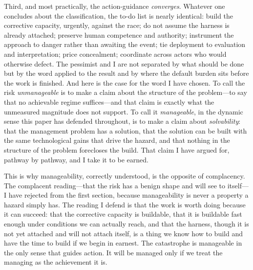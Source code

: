 \documentclass[11pt]{article}
\begin{document}
Third, and most practically, the action-guidance \emph{converges}. Whatever one concludes about the classification, the to-do list is nearly identical: build the corrective capacity, urgently, against the race; do not assume the harness is already attached; preserve human competence and authority; instrument the approach to danger rather than awaiting the event; tie deployment to evaluation and interpretation; price concealment; coordinate across actors who would otherwise defect. The pessimist and I are not separated by what should be done but by the word applied to the result and by where the default burden sits before the work is finished. And here is the case for the word I have chosen. To call the risk \emph{unmanageable} is to make a claim about the structure of the problem---to say that no achievable regime suffices---and that claim is exactly what the unmeasured magnitude does not support. To call it \emph{manageable}, in the dynamic sense this paper has defended throughout, is to make a claim about \emph{solvability}: that the management problem has a solution, that the solution can be built with the same technological gains that drive the hazard, and that nothing in the structure of the problem forecloses the build. That claim I have argued for, pathway by pathway, and I take it to be earned.

This is why manageability, correctly understood, is the opposite of complacency. The complacent reading---that the risk has a benign shape and will see to itself---I have rejected from the first section, because manageability is never a property a hazard simply has. The reading I defend is that the work is worth doing because it can succeed: that the corrective capacity is buildable, that it is buildable fast enough under conditions we can actually reach, and that the harness, though it is not yet attached and will not attach itself, is a thing we know how to build and have the time to build if we begin in earnest. The catastrophe is manageable in the only sense that guides action. It will be managed only if we treat the managing as the achievement it is.
\end{document}

